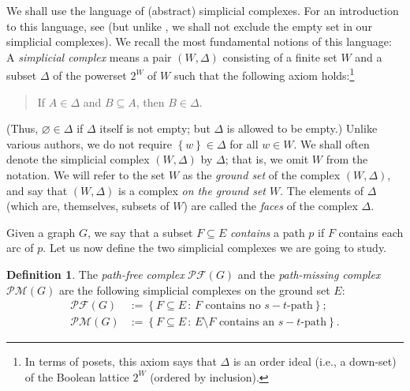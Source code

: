 \documentclass[12pt]{amsart}
\theoremstyle{definition}
\newtheorem{definition}[theorem]{Definition}
\newenvironment{statement}{\begin{quote}}{\end{quote}}
\newcommand{\with}{\,\colon\,}
\newcommand{\set}[1]{\left\{ #1 \right\}}
\newcommand{\tup}[1]{\left( #1 \right)}
\newcommand{\Pm}[1]{\mathcal{PM}\left(#1\right)}
\newcommand{\Pf}[1]{\mathcal{PF}\left(#1\right)}
\begin{document}
We shall use the language of (abstract) simplicial complexes.
For an introduction to this language, see \cite[Section 9]{Bjo} (but unlike \cite{Bjo}, we shall not exclude the empty set in our simplicial complexes).
We recall the most fundamental notions of this language:
A \emph{simplicial complex} means a pair $\tup{W, \Delta}$ consisting of a finite set $W$ and a subset $\Delta$ of the powerset $2^W$ of $W$ such that the following axiom holds:\footnote{In terms of posets, this axiom says that $\Delta$ is an order ideal (i.e., a down-set) of the Boolean lattice $2^W$ (ordered by inclusion).}
\begin{statement}
If $A \in \Delta$ and $B \subseteq A$, then $B \in \Delta$.
\end{statement}
(Thus, $\varnothing \in \Delta$ if $\Delta$ itself is not empty; but $\Delta$ is allowed to be empty.)
Unlike various authors, we do not require $\set{w} \in \Delta$ for all $w \in W$.
We shall often denote the simplicial complex $\tup{W, \Delta}$ by $\Delta$; that is, we omit $W$ from the notation.
We will refer to the set $W$ as the \emph{ground set} of the complex $\tup{W, \Delta}$, and say that $\tup{W, \Delta}$ is a complex \emph{on the ground set $W$}.
The elements of $\Delta$ (which are, themselves, subsets of $W$) are called the \emph{faces} of the complex $\Delta$.

Given a graph $G$, we say that a subset $F \subseteq E$ \emph{contains} a path $p$ if $F$ contains each arc of $p$.  Let us now define the two simplicial complexes we are going to study.

\begin{definition} \label{def.PfPm}
    The \emph{path-free complex} $\Pf{G}$ and the \emph{path-missing complex} $\Pm{G}$ are the following simplicial complexes on the ground set $E$:
    \begin{align*}
        \Pf{G} &:= \set{ F \subseteq E \with F \text{ contains no $s-t$-path}} ; \\
        \Pm{G} &:= \set{ F \subseteq E \with E\setminus F \text{ contains an $s-t$-path}} .
    \end{align*}
\end{definition}
\end{document}
